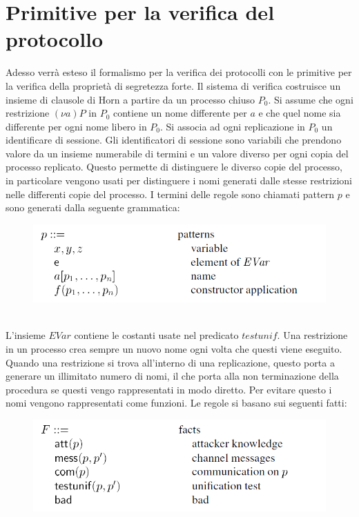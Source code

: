 \documentclass[12pt]{article}
\begin{document}
\section*{Primitive per la verifica del protocollo}
Adesso verrà esteso il formalismo per la verifica dei protocolli con le primitive per la verifica della proprietà di segretezza forte. Il sistema di verifica costruisce un insieme di clausole di Horn a partire da un processo chiuso $P_0$. Si assume che ogni restrizione $(\nu a)P$ in $P_0$ contiene un nome differente per $a$ e che quel nome sia differente per ogni nome libero in $P_0$. Si associa ad ogni replicazione in $P_0$ un identificare di sessione. Gli identificatori di sessione sono variabili che prendono valore da un insieme numerabile di termini e un valore diverso per ogni copia del processo replicato. Questo permette di distinguere le diverso copie del processo, in particolare vengono usati per distinguere i nomi generati dalle stesse restrizioni nelle differenti copie del processo. I termini delle regole sono chiamati pattern $p$ e sono generati dalla seguente grammatica:\\
\begin{figure}[ht]
    \centering
    \includegraphics[scale=0.7]{Relazione/Immagini/rule.PNG}
\end{figure}\\
L'insieme $EVar$ contiene le costanti usate nel predicato $testunif$. Una restrizione in un processo crea sempre un nuovo nome ogni volta che questi viene eseguito. Quando una restrizione si trova all'interno di una replicazione, questo porta a generare un illimitato numero di nomi, il che porta alla non terminazione della procedura se questi vengo rappresentati in modo diretto. Per evitare questo i nomi vengono rappresentati come funzioni. Le regole si basano sui seguenti fatti:\\   
\begin{figure}[h]
    \centering
    \includegraphics[scale=0.6]{Relazione/Immagini/fatti.PNG}
\end{figure}\\
\end{document}
